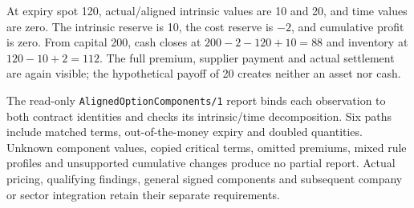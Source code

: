 At expiry spot 120, actual/aligned intrinsic values are 10 and 20, and time
values are zero. The intrinsic reserve is 10, the cost reserve is \(-2\),
and cumulative profit is zero. From capital 200, cash closes at
\(200-2-120+10=88\) and inventory at \(120-10+2=112\). The full
premium, supplier payment and actual settlement are again visible; the
hypothetical payoff of 20 creates neither an asset nor cash.

The read-only \texttt{AlignedOptionComponents/1} report binds each observation
to both contract identities and checks its intrinsic/time decomposition. Six
paths include matched terms, out-of-the-money expiry and doubled quantities.
Unknown component values, copied critical terms, omitted premiums, mixed rule
profiles and unsupported cumulative changes produce no partial report. Actual
pricing, qualifying findings, general signed components and subsequent company
or sector integration retain their separate requirements.
